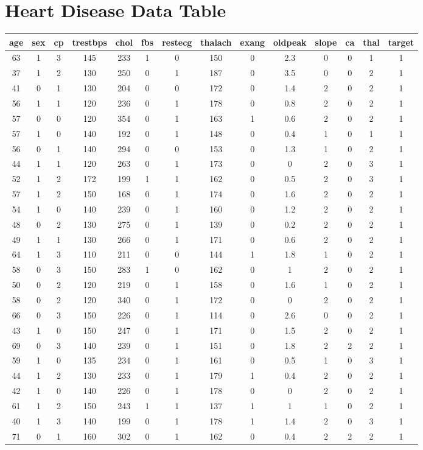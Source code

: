 \documentclass{article}
\begin{document}
\section*{Heart Disease Data Table}
\begin{tabular}{
|c|c|c|c|c|c|c|c|c|c|c|c|c|c|}
\hline
age&sex&cp&trestbps&chol&fbs&restecg&thalach&exang&oldpeak&slope&ca&thal&target \\
\hline
63&1&3&145&233&1&0&150&0&2.3&0&0&1&1 \\
\hline
37&1&2&130&250&0&1&187&0&3.5&0&0&2&1 \\
\hline
41&0&1&130&204&0&0&172&0&1.4&2&0&2&1 \\
\hline
56&1&1&120&236&0&1&178&0&0.8&2&0&2&1 \\
\hline
57&0&0&120&354&0&1&163&1&0.6&2&0&2&1 \\
\hline
57&1&0&140&192&0&1&148&0&0.4&1&0&1&1 \\
\hline
56&0&1&140&294&0&0&153&0&1.3&1&0&2&1 \\
\hline
44&1&1&120&263&0&1&173&0&0&2&0&3&1 \\
\hline
52&1&2&172&199&1&1&162&0&0.5&2&0&3&1 \\
\hline
57&1&2&150&168&0&1&174&0&1.6&2&0&2&1 \\
\hline
54&1&0&140&239&0&1&160&0&1.2&2&0&2&1 \\
\hline
48&0&2&130&275&0&1&139&0&0.2&2&0&2&1 \\
\hline
49&1&1&130&266&0&1&171&0&0.6&2&0&2&1 \\
\hline
64&1&3&110&211&0&0&144&1&1.8&1&0&2&1 \\
\hline
58&0&3&150&283&1&0&162&0&1&2&0&2&1 \\
\hline
50&0&2&120&219&0&1&158&0&1.6&1&0&2&1 \\
\hline
58&0&2&120&340&0&1&172&0&0&2&0&2&1 \\
\hline
66&0&3&150&226&0&1&114&0&2.6&0&0&2&1 \\
\hline
43&1&0&150&247&0&1&171&0&1.5&2&0&2&1 \\
\hline
69&0&3&140&239&0&1&151&0&1.8&2&2&2&1 \\
\hline
59&1&0&135&234&0&1&161&0&0.5&1&0&3&1 \\
\hline
44&1&2&130&233&0&1&179&1&0.4&2&0&2&1 \\
\hline
42&1&0&140&226&0&1&178&0&0&2&0&2&1 \\
\hline
61&1&2&150&243&1&1&137&1&1&1&0&2&1 \\
\hline
40&1&3&140&199&0&1&178&1&1.4&2&0&3&1 \\
\hline
71&0&1&160&302&0&1&162&0&0.4&2&2&2&1 \\

\end{tabular}
\end{document}
